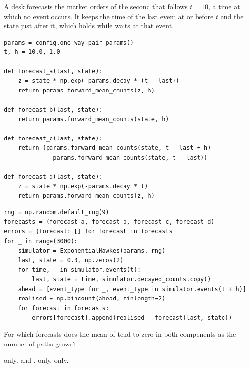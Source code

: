 \begin{question}
\label{question.forecastBetweenEventsFollowsTheFlow}
A desk forecasts the market orders of the second that follows $t = 10$,
a time at which no event occurs.
It keeps the time  of the last event at or before $t$
and the state  just after it,
which  holds while  waits at that event.
\begin{lstlisting}[caption={Four forecasts on a timer}, label=listing.forecastBetweenEventsFollowsTheFlowForecasts]
params = config.one_way_pair_params()
t, h = 10.0, 1.0

def forecast_a(last, state):
    z = state * np.exp(-params.decay * (t - last))
    return params.forward_mean_counts(z, h)

def forecast_b(last, state):
    return params.forward_mean_counts(state, h)

def forecast_c(last, state):
    return (params.forward_mean_counts(state, t - last + h)
            - params.forward_mean_counts(state, t - last))

def forecast_d(last, state):
    z = state * np.exp(-params.decay * t)
    return params.forward_mean_counts(z, h)
\end{lstlisting}
\begin{lstlisting}[caption={The forecasts against the counts realised}, label=listing.forecastBetweenEventsFollowsTheFlowRun]
rng = np.random.default_rng(9)
forecasts = (forecast_a, forecast_b, forecast_c, forecast_d)
errors = {forecast: [] for forecast in forecasts}
for _ in range(3000):
    simulator = ExponentialHawkes(params, rng)
    last, state = 0.0, np.zeros(2)
    for time, _ in simulator.events(t):
        last, state = time, simulator.decayed_counts.copy()
    ahead = [event_type for _, event_type in simulator.events(t + h)]
    realised = np.bincount(ahead, minlength=2)
    for forecast in forecasts:
        errors[forecast].append(realised - forecast(last, state))
\end{lstlisting}
For which forecasts does the mean of  tend to zero in both components
as the number of paths grows?
\begin{choices}
 \correctchoice {} only.
 \choice {} and .
 \choice {} only.
 \choice {} only.
\end{choices}
\end{question}

